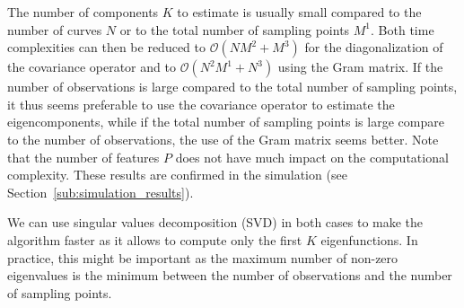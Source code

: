 The number of components $K$ to estimate is usually small compared to the number of curves $N$ or to the total number of sampling points $M^1$. Both time complexities can then be reduced to $\mathcal{O}(NM^2 + M^3)$ for the diagonalization of the covariance operator and to $\mathcal{O}(N^2M^1 + N^3)$ using the Gram matrix. If the number of observations is large compared to the total number of sampling points, it thus seems preferable to use the covariance operator to estimate the eigencomponents, while if the total number of sampling points is large compare to the number of observations, the use of the Gram matrix seems better. Note that the number of features $P$ does not have much impact on the computational complexity. These results are confirmed in the simulation (see Section~\ref{sub:simulation_results}).

\begin{remark}
We can use singular values decomposition (SVD) in both cases to make the algorithm faster as it allows to compute only the first $K$ eigenfunctions. In practice, this might be important as the maximum number of non-zero eigenvalues is the minimum between the number of observations and the number of sampling points.
\end{remark}


